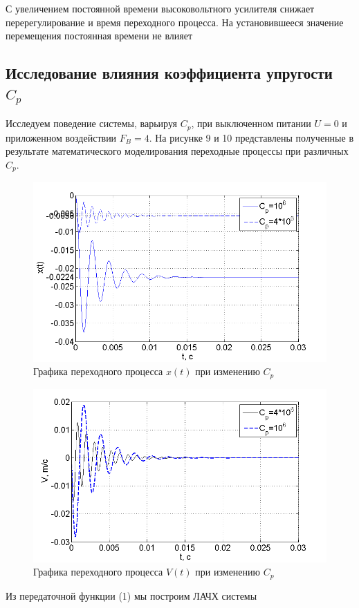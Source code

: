 \documentclass[a4paper, 12pt]{article}
\begin{document}
С увеличением постоянной времени высоковольтного усилителя снижает перерегулирование и время переходного процесса. На установившееся значение перемещения постоянная времени не влияет

\newpage
\begin{center}
	\section{Исследование влияния коэффициента упругости $C_p$}
\end{center} \par
Исследуем поведение системы, варьируя $C_p$, при выключенном питании $U = 0$ и приложенном воздействии $F_B = 4$. На рисунке 9 и 10 представлены полученные в результате математического моделирования переходные процессы при различных $C_p$.

\begin{figure}[h]
	\centering
	\includegraphics[width=0.7\linewidth]{9}
	\caption{Графика переходного процесса $x(t)$ при изменению $C_{p}$}
	\label{}
\end{figure}
\begin{figure}[h]
	\centering
	\includegraphics[width=0.7\linewidth]{11}
	\caption{Графика переходного процесса $V(t)$ при изменению $C_{p}$}
	\label{}
\end{figure}
\newpage
Из передаточной функции (1) мы построим ЛАЧХ системы\par 
\end{document}
